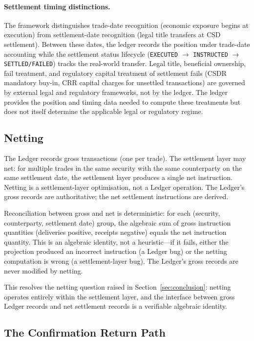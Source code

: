 \documentclass[11pt,a4paper]{article}
\begin{document}
\paragraph{Settlement timing distinctions.} The framework distinguishes trade-date recognition (economic exposure begins at execution) from settlement-date recognition (legal title transfers at CSD settlement). Between these dates, the ledger records the position under trade-date accounting while the settlement status lifecycle (\texttt{EXECUTED} $\to$ \texttt{INSTRUCTED} $\to$ \texttt{SETTLED/FAILED}) tracks the real-world transfer. Legal title, beneficial ownership, fail treatment, and regulatory capital treatment of settlement fails (CSDR mandatory buy-in, CRR capital charges for unsettled transactions) are governed by external legal and regulatory frameworks, not by the ledger. The ledger provides the position and timing data needed to compute these treatments but does not itself determine the applicable legal or regulatory regime.

\subsection{Netting}
\label{sec:settlement-netting}

The Ledger records gross transactions (one per trade). The settlement layer may net: for multiple trades in the same security with the same counterparty on the same settlement date, the settlement layer produces a single net instruction. Netting is a settlement-layer optimisation, not a Ledger operation. The Ledger's gross records are authoritative; the net settlement instructions are derived.

Reconciliation between gross and net is deterministic: for each (security, counterparty, settlement date) group, the algebraic sum of gross instruction quantities (deliveries positive, receipts negative) equals the net instruction quantity. This is an algebraic identity, not a heuristic---if it fails, either the projection produced an incorrect instruction (a Ledger bug) or the netting computation is wrong (a settlement-layer bug). The Ledger's gross records are never modified by netting.

This resolves the netting question raised in Section~\ref{sec:conclusion}: netting operates entirely within the settlement layer, and the interface between gross Ledger records and net settlement records is a verifiable algebraic identity.

\subsection{The Confirmation Return Path}
\label{sec:settlement-confirmation}
\end{document}
